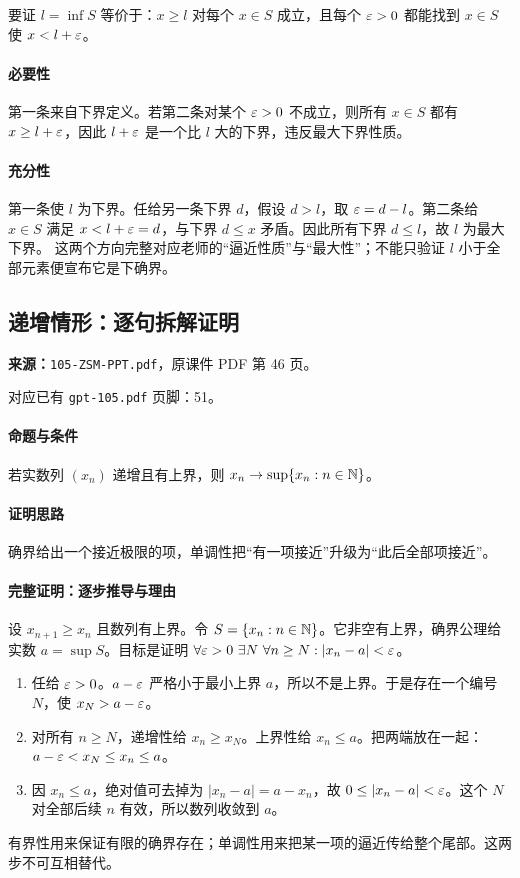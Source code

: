 要证 $l=\inf S$ 等价于：$x\ge l$ 对每个 $x\in S$ 成立，且每个 $\varepsilon>0$ 都能找到 $x\in S$ 使 $x<l+\varepsilon$。
\paragraph{必要性}第一条来自下界定义。若第二条对某个 $\varepsilon>0$ 不成立，则所有 $x\in S$ 都有 $x\ge l+\varepsilon$，因此 $l+\varepsilon$ 是一个比 $l$ 大的下界，违反最大下界性质。
\paragraph{充分性}第一条使 $l$ 为下界。任给另一条下界 $d$，假设 $d>l$，取 $\varepsilon=d-l$。第二条给 $x\in S$ 满足 $x<l+\varepsilon=d$，与下界 $d\le x$ 矛盾。因此所有下界 $d\le l$，故 $l$ 为最大下界。
这两个方向完整对应老师的“逼近性质”与“最大性”；不能只验证 $l$ 小于全部元素便宣布它是下确界。

\clearpage\subsection{递增情形：逐句拆解证明}
\textbf{来源：}\texttt{105-ZSM-PPT.pdf}，原课件 PDF 第 46 页。\par
对应已有 \texttt{gpt-105.pdf} 页脚：51。\par
\paragraph{命题与条件}若实数列 $(x_n)$ 递增且有上界，则 $x_n\to\sup\{x_n:n\in\mathbb{N}\}$。
\paragraph{证明思路}确界给出一个接近极限的项，单调性把“有一项接近”升级为“此后全部项接近”。
\paragraph{完整证明：逐步推导与理由}

设 $x_{n+1}\ge x_n$ 且数列有上界。令 $S=\{x_n:n\in\mathbb{N}\}$。它非空有上界，确界公理给实数 $a=\sup S$。目标是证明 $\forall\varepsilon>0\ \exists N\ \forall n\ge N:|x_n-a|<\varepsilon$。
\begin{enumerate}
\item 任给 $\varepsilon>0$。$a-\varepsilon$ 严格小于最小上界 $a$，所以不是上界。于是存在一个编号 $N$，使 $x_N>a-\varepsilon$。
\item 对所有 $n\ge N$，递增性给 $x_n\ge x_N$。上界性给 $x_n\le a$。把两端放在一起：$a-\varepsilon<x_N\le x_n\le a$。
\item 因 $x_n\le a$，绝对值可去掉为 $|x_n-a|=a-x_n$，故 $0\le|x_n-a|<\varepsilon$。这个 $N$ 对全部后续 $n$ 有效，所以数列收敛到 $a$。
\end{enumerate}
有界性用来保证有限的确界存在；单调性用来把某一项的逼近传给整个尾部。这两步不可互相替代。

